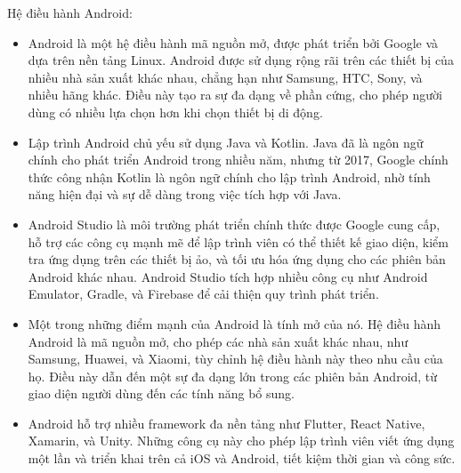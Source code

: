     \begin{flushleft}
      \hspace*{0.8cm}Hệ điều hành Android:
      \setlength{\leftmargini}{1.5cm}
      \begin{itemize}
          \item Android là một hệ điều hành mã nguồn mở, được phát triển bởi Google và dựa trên nền tảng Linux. Android được sử dụng rộng rãi trên các thiết bị của nhiều nhà sản xuất khác nhau, chẳng hạn như Samsung, HTC, Sony, và nhiều hãng khác. Điều này tạo ra sự đa dạng về phần cứng, cho phép người dùng có nhiều lựa chọn hơn khi chọn thiết bị di động.
          \item Lập trình Android chủ yếu sử dụng Java và Kotlin. Java đã là ngôn ngữ chính cho phát triển Android trong nhiều năm, nhưng từ 2017, Google chính thức công nhận Kotlin là ngôn ngữ chính cho lập trình Android, nhờ tính năng hiện đại và sự dễ dàng trong việc tích hợp với Java.
          \item Android Studio là môi trường phát triển chính thức được Google cung cấp, hỗ trợ các công cụ mạnh mẽ để lập trình viên có thể thiết kế giao diện, kiểm tra ứng dụng trên các thiết bị ảo, và tối ưu hóa ứng dụng cho các phiên bản Android khác nhau. Android Studio tích hợp nhiều công cụ như Android Emulator, Gradle, và Firebase để cải thiện quy trình phát triển.
          \item Một trong những điểm mạnh của Android là tính mở của nó. Hệ điều hành Android là mã nguồn mở, cho phép các nhà sản xuất khác nhau, như Samsung, Huawei, và Xiaomi, tùy chỉnh hệ điều hành này theo nhu cầu của họ. Điều này dẫn đến một sự đa dạng lớn trong các phiên bản Android, từ giao diện người dùng đến các tính năng bổ sung.
          \item Android hỗ trợ nhiều framework đa nền tảng như Flutter, React Native, Xamarin, và Unity. Những công cụ này cho phép lập trình viên viết ứng dụng một lần và triển khai trên cả iOS và Android, tiết kiệm thời gian và công sức.
      \end{itemize}
    \end{flushleft}

